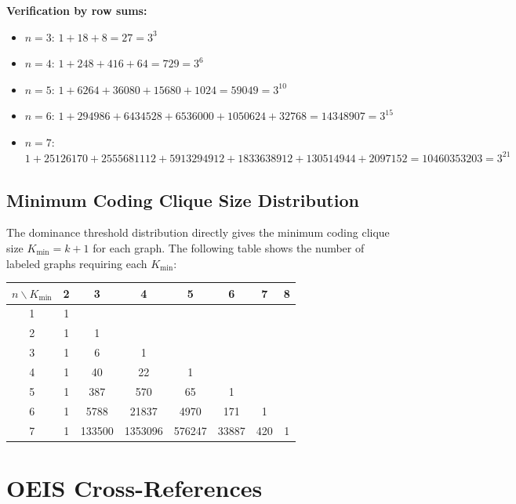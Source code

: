 \documentclass[11pt,a4paper]{article}
\theoremstyle{definition}
\begin{document}
\textbf{Verification by row sums:}
\begin{itemize}
\item $n = 3$: $1 + 18 + 8 = 27 = 3^3$ \checkmark
\item $n = 4$: $1 + 248 + 416 + 64 = 729 = 3^6$ \checkmark
\item $n = 5$: $1 + 6264 + 36080 + 15680 + 1024 = 59049 = 3^{10}$ \checkmark
\item $n = 6$: $1 + 294986 + 6434528 + 6536000 + 1050624 + 32768 = 14348907 = 3^{15}$ \checkmark
\item $n = 7$: $1 + 25126170 + 2555681112 + 5913294912 + 1833638912 + 130514944 + 2097152 = 10460353203 = 3^{21}$ \checkmark
\end{itemize}

\subsection{Minimum Coding Clique Size Distribution}

The dominance threshold distribution directly gives the minimum coding clique size $K_{\min} = k + 1$ for each graph. The following table shows the number of labeled graphs requiring each $K_{\min}$:

\begin{center}
\begin{tabular}{c|ccccccc}
\toprule
$n \backslash K_{\min}$ & 2 & 3 & 4 & 5 & 6 & 7 & 8 \\
\midrule
1 & 1 & & & & & & \\
2 & 1 & 1 & & & & & \\
3 & 1 & 6 & 1 & & & & \\
4 & 1 & 40 & 22 & 1 & & & \\
5 & 1 & 387 & 570 & 65 & 1 & & \\
6 & 1 & 5788 & 21837 & 4970 & 171 & 1 & \\
7 & 1 & 133500 & 1353096 & 576247 & 33887 & 420 & 1 \\
\bottomrule
\end{tabular}
\end{center}

\section{OEIS Cross-References}
\end{document}
